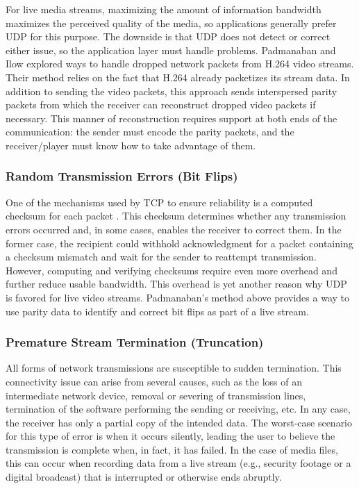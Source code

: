For live media streams, maximizing the amount of information bandwidth maximizes the perceived quality of the media, so applications generally prefer UDP for this purpose. The downside is that UDP does not detect or correct either issue, so the application layer must handle problems. Padmanaban and Ilow \cite{padmanaban2015} explored ways to handle dropped network packets from H.264 video streams. Their method relies on the fact that H.264 already packetizes its stream data. In addition to sending the video packets, this approach sends interspersed parity packets from which the receiver can reconstruct dropped video packets if necessary. This manner of reconstruction requires support at both ends of the communication: the sender must encode the parity packets, and the receiver/player must know how to take advantage of them.

\subsubsection{Random Transmission Errors (Bit Flips)}

One of the mechanisms used by TCP to ensure reliability is a computed checksum for each packet \cite{cerf1974}. This checksum determines whether any transmission errors occurred and, in some cases, enables the receiver to correct them. In the former case, the recipient could withhold acknowledgment for a packet containing a checksum mismatch and wait for the sender to reattempt transmission. However, computing and verifying checksums require even more overhead and further reduce usable bandwidth. This overhead is yet another reason why UDP is favored for live video streams. Padmanaban's method above provides a way to use parity data to identify and correct bit flips as part of a live stream.

\subsubsection{Premature Stream Termination (Truncation)}

All forms of network transmissions are susceptible to sudden termination. This connectivity issue can arise from several causes, such as the loss of an intermediate network device, removal or severing of transmission lines, termination of the software performing the sending or receiving, etc. In any case, the receiver has only a partial copy of the intended data. The worst-case scenario for this type of error is when it occurs silently, leading the user to believe the transmission is complete when, in fact, it has failed. In the case of media files, this can occur when recording data from a live stream (e.g., security footage or a digital broadcast) that is interrupted or otherwise ends abruptly.

